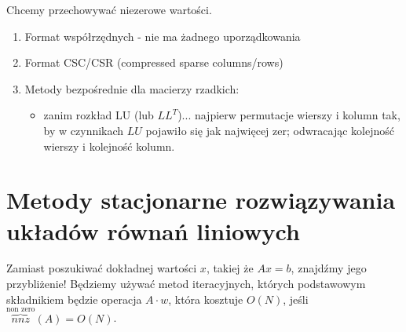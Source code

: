 \documentclass[hidelinks,a4paper,fleqn,oneside]{book}
\begin{document}
Chcemy przechowywać niezerowe wartości.

\begin{enumerate}
	\item Format współrzędnych - nie ma żadnego uporządkowania
	      	
	\item Format CSC/CSR (compressed sparse columns/rows)
	      
	\item Metody bezpośrednie dla macierzy rzadkich:
	      \begin{itemize}
	      	\item zanim rozkład LU (lub $LL^T$)... najpierw permutacje wierszy i kolumn tak, by w czynnikach $LU$ pojawiło się jak najwięcej zer;
	      	      odwracając kolejność wierszy i kolejność kolumn.
	      \end{itemize}
\end{enumerate}


\section{Metody stacjonarne rozwiązywania układów równań liniowych}
Zamiast poszukiwać dokładnej wartości $x$, takiej że $Ax=b$, znajdźmy jego przybliżenie! Będziemy używać metod iteracyjnych, których podstawowym składnikiem będzie operacja $A \cdot w$, która kosztuje $O(N)$, jeśli $\overbrace{nnz}^{\textrm{non zero}}(A) = O(N)$.
\end{document}
